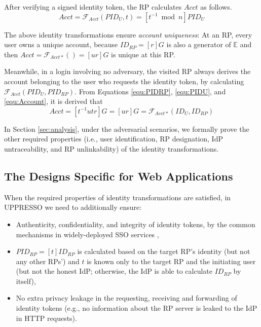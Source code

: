 After verifying a signed identity token, the RP calculates $Acct$ as follows.
\begin{equation}
Acct = \mathcal{F}_{Acct}(PID_{U},t)
   = [t^{-1} \bmod n]PID_{U}
   \label{equ:Account}
\end{equation}

The above identity transformations ensure \emph{account uniqueness}:
    At an RP, every user owns a unique account, because $ID_{RP} = [r]G$ is also a generator of $\mathbb{E}$ and then
     $Acct = \mathcal{F}_{Acct\ast}()=[ur]G$ is unique at this RP.

Meanwhile, in a login involving no adversary,
 the visited RP always derives the account belonging to the user who requests the identity token,
    by calculating $\mathcal{F}_{Acct}(PID_{U}, PID_{RP})$.
From Equations \ref{equ:PIDRP}, \ref{equ:PIDU}, and \ref{equ:Account}, it is derived that
\begin{equation}
   Acct =  [t^{-1}utr]G = [ur]G = \mathcal{F}_{Acct\ast}(ID_U, ID_{RP})
   \label{equ:AccountNotChanged}
\end{equation}


In Section \ref{sec:analysis},
    under the adversarial scenarios, we formally prove the other required properties (i.e.,
    user identification, RP designation, IdP untraceability, and RP unlinkability) of the identity transformations.

\subsection{The Designs Specific for Web Applications}
\label{sec:web-design}

When the required properties of identity transformations are satisfied,
    in UPPRESSO we need to additionally ensure:
\begin{itemize}
  \item Authenticity, confidentiality, and integrity of identity tokens,
  by the common mechanisms in widely-deployed SSO services \cite{OpenIDConnect, rfc6749, SAML,GoogleIdIntegrate,de2014oauth,FettKS14,BrowserID,uber},
  \item $PID_{RP} = [t]{ID_{RP}}$ is calculated based on the target RP's identity (but not any other RPs') and $t$ is known only to the target RP and the initiating user (but not the honest IdP; otherwise, the IdP is able to calculate $ID_{RP}$ by itself),
  \item 
No extra privacy leakage in the requesting, receiving and forwarding of identity tokens
(e.g., no information about the RP server is leaked to the IdP in HTTP requests).
\end{itemize}

